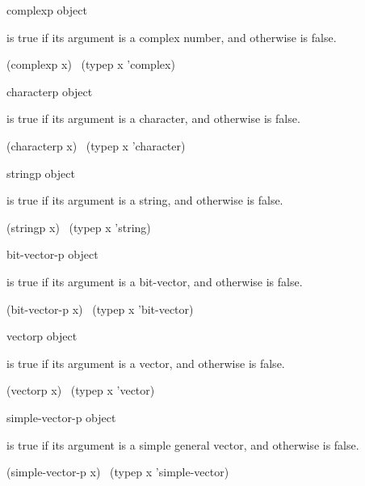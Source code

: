 \begin{defun}[Function]
complexp object

 is true if its argument is a complex number,
and otherwise is false.
\begin{lisp}
(complexp x) \EQ\ (typep x 'complex)
\end{lisp}
\end{defun}

\begin{defun}[Function]
characterp object

 is true if its argument is a character,
and otherwise is false.
\begin{lisp}
(characterp x) \EQ\ (typep x 'character)
\end{lisp}
\end{defun}

\begin{defun}[Function]
stringp object

 is true if its argument is a string,
and otherwise is false.
\begin{lisp}
(stringp x) \EQ\ (typep x 'string)
\end{lisp}
\end{defun}

\begin{defun}[Function]
bit-vector-p object

 is true if its argument is a bit-vector,
and otherwise is false.
\begin{lisp}
(bit-vector-p x) \EQ\ (typep x 'bit-vector)
\end{lisp}
\end{defun}

\begin{defun}[Function]
vectorp object

 is true if its argument is a vector,
and otherwise is false.
\begin{lisp}
(vectorp x) \EQ\ (typep x 'vector)
\end{lisp}
\end{defun}

\begin{defun}[Function]
simple-vector-p object

 is true if its argument is a simple general vector,
and otherwise is false.
\begin{lisp}
(simple-vector-p x) \EQ\ (typep x 'simple-vector)
\end{lisp}
\end{defun}

